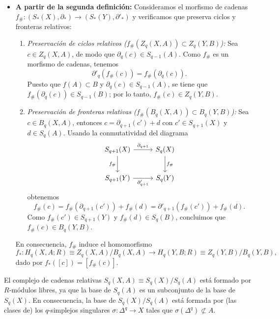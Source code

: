 \begin{itemize}
    \item \textbf{A partir de la segunda definición:} Consideramos el morfismo de cadenas $f_\# \colon (S_*(X), \partial_*) \to (S_*(Y), \partial'_*)$ y verificamos que preserva ciclos y fronteras relativos:
    \begin{enumerate}
        \item \textit{Preservación de ciclos relativos ($f_\#(Z_q(X, A)) \subset Z_q(Y, B)$):} Sea $c \in Z_q(X, A)$, de modo que $\partial_q(c) \in S_{q-1}(A)$. Como $f_\#$ es un morfismo de cadenas, tenemos
        \[
        \partial'_q(f_\#(c)) = f_\#(\partial_q(c)).
        \]
        Puesto que $f(A) \subset B$ y $\partial_q(c) \in S_{q-1}(A)$, se tiene que $f_\#(\partial_q(c)) \in S_{q-1}(B)$; por lo tanto, $f_\#(c) \in Z_q(Y, B)$.

        \item \textit{Preservación de fronteras relativas ($f_\#(B_q(X, A)) \subset B_q(Y, B)$):} Sea $c \in B_q(X, A)$, entonces $c = \partial_{q+1}(c') + d$ con $c' \in S_{q+1}(X)$ y $d \in S_q(A)$. Usando la conmutatividad del diagrama
        \[
        \begin{tikzcd}[column sep=2.8em, row sep=2.4em]
        S_{q+1}(X) \arrow[r, "\partial_{q+1}"] \arrow[d, "f_\#"'] & S_q(X) \arrow[d, "f_\#"] \\
        S_{q+1}(Y) \arrow[r, "\partial'_{q+1}"'] & S_q(Y)
        \end{tikzcd}
        \]
        obtenemos
        \[
        f_\#(c) = f_\#(\partial_{q+1}(c')) + f_\#(d) = \partial'_{q+1}(f_\#(c')) + f_\#(d).
        \]
        Como $f_\#(c') \in S_{q+1}(Y)$ y $f_\#(d) \in S_q(B)$, concluimos que $f_\#(c) \in B_q(Y, B)$.
    \end{enumerate}
    En consecuencia, $f_\#$ induce el homomorfismo
    \[
    f_* \colon H_q(X, A; R) \equiv Z_q(X, A)/B_q(X, A) \longrightarrow H_q(Y, B; R) \equiv Z_q(Y, B)/B_q(Y, B),
    \]
    dado por $f_*([c]) = [f_\#(c)]$.
\end{itemize}
\begin{nota}
El complejo de cadenas relativas $S_q(X, A) \equiv S_q(X)/S_q(A)$ está formado por $R$-módulos libres, ya que la base de $S_q(A)$ es un subconjunto de la base de $S_q(X)$. En consecuencia, la base de $S_q(X)/S_q(A)$ está formada por (las clases de) los $q$-simplejos singulares $\sigma \colon \Delta^q \to X$ tales que $\sigma(\Delta^q) \not\subset A$.
\end{nota}

